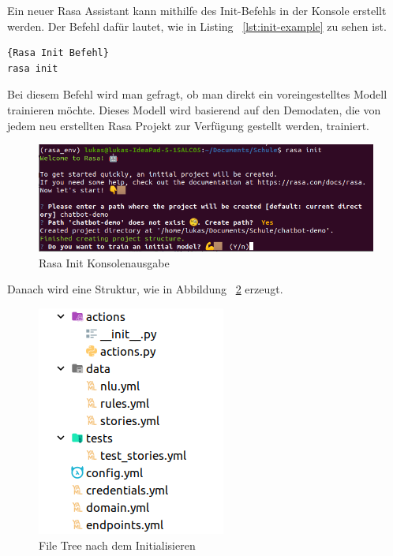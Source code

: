 Ein neuer Rasa Assistant kann mithilfe des Init-Befehls in der Konsole erstellt werden.
Der Befehl dafür lautet, wie in Listing ~\ref{lst:init-example} zu sehen ist.

\begin{lstlisting}[language=bash,label={lst:init-example},caption={Befehl fürs Initialisieren}]{Rasa Init Befehl}
rasa init
\end{lstlisting}

Bei diesem Befehl wird man gefragt, ob man direkt ein voreingestelltes Modell trainieren möchte.
Dieses Modell wird basierend auf den Demodaten, die von jedem neu erstellten Rasa Projekt zur Verfügung gestellt werden, trainiert.

\begin{figure}[hbt!]
    \centering
    \includegraphics[scale=0.6]{pics/rasa_init}
    \caption{Rasa Init Konsolenausgabe}
    \label{fig:rasa_init}
\end{figure}

Danach wird eine Struktur, wie in Abbildung ~\ref{fig:file_tree} erzeugt.

\begin{figure}[hbt!]
    \centering
    \includegraphics[scale=0.75]{pics/rasa_file_tree}
    \caption{File Tree nach dem Initialisieren}
    \label{fig:file_tree}
\end{figure}



